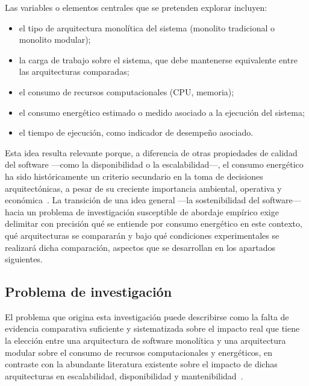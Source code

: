 Las variables o elementos centrales que se pretenden explorar incluyen:
\begin{itemize}
  \item el tipo de arquitectura monolítica del sistema (monolito tradicional o monolito modular);
  \item la carga de trabajo sobre el sistema, que debe mantenerse equivalente entre las arquitecturas comparadas;
  \item el consumo de recursos computacionales (CPU, memoria);
  \item el consumo energético estimado o medido asociado a la ejecución del sistema;
  \item el tiempo de ejecución, como indicador de desempeño asociado.
\end{itemize}

Esta idea resulta relevante porque, a diferencia de otras propiedades de calidad del software ---como la disponibilidad o la escalabilidad---, el consumo energético ha sido históricamente un criterio secundario en la toma de decisiones arquitectónicas, a pesar de su creciente importancia ambiental, operativa y económica~\cite{anwar2017towards}. La transición de una idea general ---la sostenibilidad del software--- hacia un problema de investigación susceptible de abordaje empírico exige delimitar con precisión qué se entiende por consumo energético en este contexto, qué arquitecturas se compararán y bajo qué condiciones experimentales se realizará dicha comparación, aspectos que se desarrollan en los apartados siguientes.

\subsection{Problema de investigación}
\label{sec:problema}

El problema que origina esta investigación puede describirse como la falta de evidencia comparativa suficiente y sistematizada sobre el impacto real que tiene la elección entre una arquitectura de software monolítica y una arquitectura modular sobre el consumo de recursos computacionales y energéticos, en contraste con la abundante literatura existente sobre el impacto de dichas arquitecturas en escalabilidad, disponibilidad y mantenibilidad~\cite{jagroep2017extending}.


